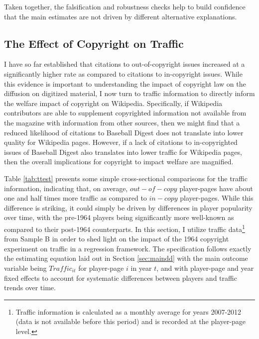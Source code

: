 \documentclass[11pt]{article}
\begin{document}
Taken together, the falsification and robustness checks help to build confidence that the main estimates are not driven by different alternative explanations. 

\subsection{The Effect of Copyright on Traffic}

I have so far established that citations to out-of-copyright issues increased at a significantly higher rate as compared to citations to in-copyright issues. While this evidence is important to understanding the impact of copyright law on the diffusion on digitized material, I now turn to traffic information to directly inform the welfare impact of copyright on Wikipedia. Specifically, if Wikipedia contributors are able to supplement copyrighted information not available from the magazine with information from other sources, then we might find that a reduced likelihood of citations to Baseball Digest does not translate into lower quality for Wikipedia pages. However, if a lack of citations to in-copyrighted issues of Baseball Digest also translates into lower traffic for Wikipedia pages, then the overall implications for copyright to impact welfare are magnified.

Table \ref{tab:ttest} presents some simple cross-sectional comparisons for the traffic information, indicating that, on average, $out-of-copy$ player-pages have about one and half times more traffic as compared to $in-copy$  player-pages. While this difference is striking, it could simply be driven by differences in player popularity over time, with the pre-1964 players being significantly more well-known as compared to their post-1964 counterparts. In this section, I utilize traffic data\footnote{Traffic information is calculated as a monthly average for years 2007-2012 (data is not available before this period) and is recorded at the player-page level.} from Sample B in order to shed light on the impact of the 1964 copyright experiment on traffic in a regression framework. The specification follows exactly the estimating equation laid out in Section \ref{sec:maindd} with the main outcome variable being $Traffic_{it}$ for player-page $i$ in year $t$, and with player-page and year fixed effects to account for systematic differences between players and traffic trends over time. 
\end{document}
